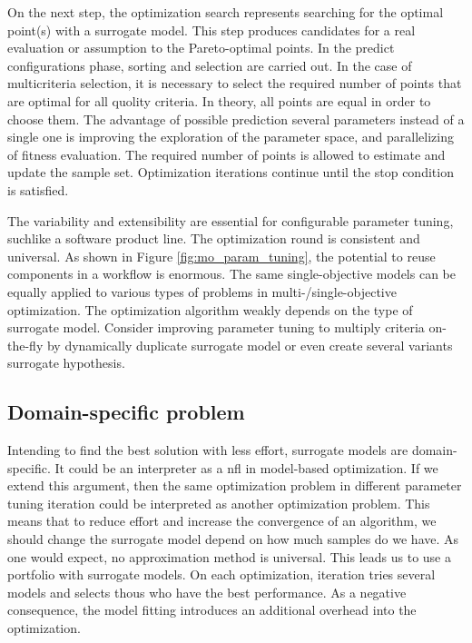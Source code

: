             On the next step, the optimization search represents searching for the optimal point(s) with a surrogate model. This step produces candidates for a real evaluation or assumption to the Pareto-optimal points. In the predict configurations phase, sorting and selection are carried out. In the case of multicriteria selection, it is necessary to select the required number of points that are optimal for all quolity criteria. In theory, all points are equal in order to choose them. The advantage of possible prediction several parameters instead of a single one is improving the exploration of the parameter space, and parallelizing of fitness evaluation. The required number of points is allowed to estimate and update the sample set. Optimization iterations continue until the stop condition is satisfied.
    
            The variability and extensibility are essential for configurable parameter tuning, suchlike a software product line. The optimization round is consistent and universal. As shown in Figure \ref{fig:mo_param_tuning}, the potential to reuse components in a workflow is enormous. The same single-objective models can be equally applied to various types of problems in multi-/single-objective optimization. The optimization algorithm weakly depends on the type of surrogate model. Consider improving parameter tuning to multiply criteria on-the-fly by dynamically duplicate surrogate model or even create several variants surrogate hypothesis.

        \subsection{Domain-specific problem}
        Intending to find the best solution with less effort, surrogate models are domain-specific. It could be an interpreter as a \Gls{nfl} in model-based optimization. If we extend this argument, then the same optimization problem in different parameter tuning iteration could be interpreted as another optimization problem. This means that to reduce effort and increase the convergence of an algorithm, we should change the surrogate model depend on how much samples do we have. As one would expect, no approximation method is universal.
        This leads us to use a portfolio with surrogate models. On each optimization, iteration tries several models and selects thous who have the best performance. As a negative consequence, the model fitting introduces an additional overhead into the optimization.


